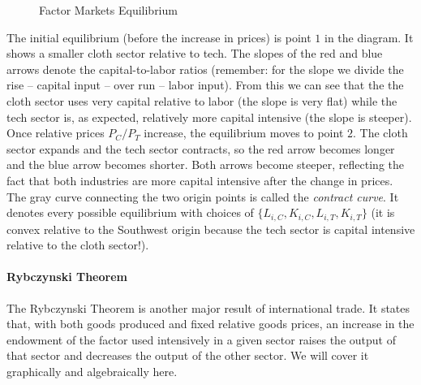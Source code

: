 \documentclass[11pt,letterpaper]{article}
\begin{document}
\begin{figure}
    \caption{Factor Markets Equilibrium}
    \label{fig: factor-mkt-eqm-trade}
\end{figure}

The initial equilibrium (before the increase in prices) is point $1$ in the diagram. It shows a smaller cloth sector relative to tech. The slopes of the red and blue arrows denote the capital-to-labor ratios (remember: for the slope we divide the rise -- capital input -- over run -- labor input). From this we can see that the the cloth sector uses very capital relative to labor (the slope is very flat) while the tech sector is, as expected, relatively more capital intensive (the slope is steeper). Once relative prices $P_C / P_T$ increase, the equilibrium moves to point $2$. The cloth sector expands and the tech sector contracts, so the red arrow becomes longer and the blue arrow becomes shorter. Both arrows become steeper, reflecting the fact that both industries are more capital intensive after the change in prices. The gray curve connecting the two origin points is called the \textit{contract curve}. It denotes every possible equilibrium with choices of $\{L_{i,C},K_{i,C},L_{i,T},K_{i,T}\}$ (it is convex relative to the Southwest origin because the tech sector is capital intensive relative to the cloth sector!).




\paragraph{Rybczynski Theorem} The Rybczynski Theorem is another major result of international trade. It states that, with both goods produced and fixed relative goods prices, an increase in the endowment of the factor used intensively in a given sector raises the output of that sector and decreases the output of the other sector. We will cover it graphically and algebraically here.
\end{document}
